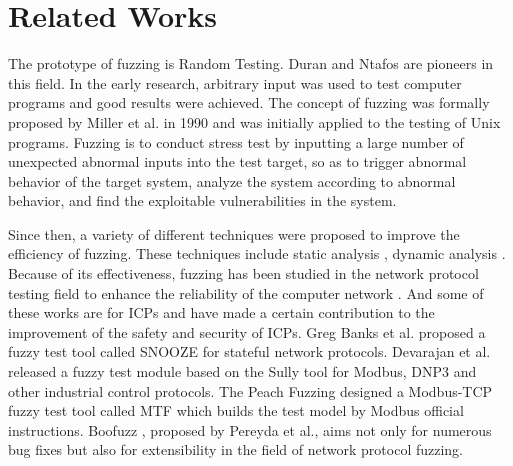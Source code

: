 \section{Related Works}
The prototype of fuzzing is Random Testing. Duran and Ntafos \cite{duran1984evaluation} are pioneers in this field. In the early research, arbitrary input was used to test computer programs and good results were achieved. The concept of fuzzing was formally proposed by Miller et al. \cite{miller1990empirical} in 1990 and was initially applied to the testing of Unix programs. Fuzzing is to conduct stress test by inputting a large number of unexpected abnormal inputs into the test target, so as to trigger abnormal behavior of the target system, analyze the system according to abnormal behavior, and find the exploitable vulnerabilities in the system.

Since then, a variety of different techniques were proposed to improve the efficiency of fuzzing. These techniques include static analysis \cite{sparks2007automated} \cite{kinder2009abstract}, dynamic analysis \cite{hoschele2016mining} \cite{bastani2017synthesizing} \cite{kifetew2017generating}. Because of its effectiveness, fuzzing has been studied in the network protocol testing field to enhance the reliability of the computer network \cite{aitel2002introduction} \cite{amini2010sulley} \cite{gorbunov2010autofuzz} \cite{eddington2011peach} \cite{tsankov2012secfuzz} \cite{chen2018iotfuzzer}. And some of these works are for ICPs and have made a certain contribution to the improvement of the safety and security of ICPs. Greg Banks et al. proposed a fuzzy test tool called SNOOZE \cite{banks2006snooze} for stateful network protocols. Devarajan et al. \cite{devarajan2007unraveling} released a fuzzy test module based on the Sully tool for Modbus, DNP3 and other industrial control protocols. The Peach Fuzzing  \cite{voyiatzis2015modbus} designed a Modbus-TCP fuzzy test tool called MTF which builds the test model by Modbus official instructions. Boofuzz \cite{pereyda2017boofuzz}, proposed by Pereyda et al., aims not only for numerous bug fixes but also for extensibility in the field of network protocol fuzzing.


